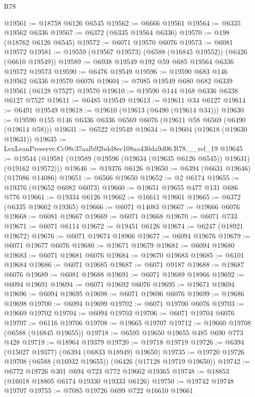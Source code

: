 \begin{lexlean}{R78}
\begin{coremodule}
@19561 := @18758 @6126 @6545
@19562 := @6666 @19561
@19564 := @6335 @19562 @6336
@19567 := @6372 (@6335 @19564 @6336)
@19570 := @198 (@18762 @6126 @6545)
@19572 := @6071 @19570 @6076
@19573 := @6081 @19572
@19581 := @19559 (@19567 @19573) (@6588 (@16845 @19552)) (@6426 (@6610 @19549))
@19589 := @6938 @19549 @192 @59 @685 @19564 @6336 @19572 @19573
@19590 := @6476 @19549
@19596 := @19590 @683 @146 @19562 @6336 @19570 @6076
@19604 := @7085 @19549 @680 @682 @6339 @19561 (@6128 @7527) @19570
@19610 := @19590 @144 @168 @6336 @6338 @6127 @7527
@19611 := @6485 @19549
@19613 := @19611 @34 @6127
@19614 := @6491 @19549
@19618 := @19610 (@19613 (@6490 (@19614 @34)))
@19630 := @19590 @155 @146 @6336 @6336 @6569 @6076 (@19611 @58 @6569 (@6490 (@19614 @58)))
@19631 := @6522 @19549
@19634 := @19604 (@19618 (@19630 @19631))
@19635 := LexLeanPreserve.Cc98c37aafb92bdd8ec108aa430da9d06.R78.__rel_19
@19645 := @19544 (@19581 (@19589 (@19596 (@19634 (@19635 @6126 @6545)) @19631) (@19162 @19572)))
@19646 := @19376 @6126
@19650 := @6394 (@6631 @19646) (@17086 @14086)
@19651 := @6566 @19650
@19652 := @2 @6174
@19655 := @19376 (@19652 @6082 @6073)
@19660 := @19651 @19655 @477 @131 @686 @776
@19661 := @19334 @6126
@19662 := @16611 @19661
@19665 := @6372 (@6335 @19662 @19365)
@19666 := @6071 @14083
@19667 := @19666 @6076
@19668 := @6081 @19667
@19669 := @6071 @19668
@19670 := @6071 @733
@19671 := @6071 @6114
@19672 := @19451 @6126
@19674 := @6247 (@18921 @19672)
@19676 := @6071 @19674 @18966
@19677 := @6094 @19676
@19679 := @6071 @19677 @6076
@19680 := @19671 @19679
@19681 := @6094 @19680
@19683 := @6071 @19681 @6076
@19684 := @19670 @19683
@19685 := @6101 @19684
@19686 := @6071 @19685
@19687 := @6071 @9187
@19688 := @19687 @6076
@19689 := @6081 @19688
@19691 := @6071 @19689 @18966
@19692 := @6094 @19691
@19694 := @6071 @19692 @6076
@19695 := @19671 @19694
@19696 := @6094 @19695
@19698 := @6071 @19696 @6076
@19699 := @19686 @19698
@19700 := @6094 @19699
@19702 := @6071 @19700 @6076
@19703 := @19669 @19702
@19704 := @6094 @19703
@19706 := @6071 @19704 @6076
@19707 := @6116 @19706
@19708 := @19665 @19707
@19712 := @19660 @19708 (@6588 (@16845 @19655))
@19718 := @6595 @19650 @19655 @485 @690 @773 @428
@19719 := @18964 @19379
@19720 := @19718 @19719
@19726 := @6394 (@15027 @19377) (@6394 (@6833 @18949) @19650)
@19735 := @19720 @19726 @19708 (@6588 (@16932 @19655)) (@6426 (@17128 @19719 @19650))
@19742 := @6772 @19726 @301 @694 @723 @772 @19662 @19365
@19748 := @18853 (@16018 @18805 @6174 @19330 @19333 @6126)
@19750 := @19742 @19748 @19707
@19755 := @7085 @19726 @699 @722 @16610 @19661

\end{coremodule}
\end{lexlean}
